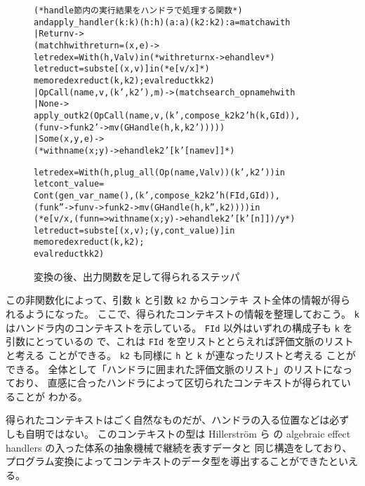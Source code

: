 \begin{figure}
\begin{spacing}{0.9}
\begin{alltt}
(* handle 節内の実行結果をハンドラで処理する関数 *)
and apply_handler (k : k) (h : h) (a : a) (k2 : k2) : a = match a with
  | Return v ->
    (match h with \LBR{}return = (x, e)\RBR ->
      \colorbox{lg}{let redex = With (h, Val v) in  (* with \LBR{}return x -> e\RBR handle v *)}
      let reduct = subst e [(x, v)] in  \colorbox{lg}{(* e[v/x] *)}
      \colorbox{lg}{memo redex reduct (k, k2);} eval reduct k k2)
  | OpCall (name, v, \colorbox{lg}{(k', k2'),} m) -> (match search_op name h with
    | None ->
      apply_out k2 (OpCall (name, v, \colorbox{lg}{(k', compose_k2 k2' h (k, GId)),}
        (fun v -> fun k2' -> m v (GHandle (h, k, k2')))))
    | Some (x, y, e) ->
      \colorbox{lg}{(* with \LBR{}name(x; y) -> e\RBR handle k2'[k'[name v]] *)}
\end{alltt}
\vspace{-26pt}
\begin{alltt}
      \colorbox{lg}{let redex = With (h, plug_all (Op (name, Val v)) (k', k2')) in}
      let cont_value =
        Cont (\colorbox{lg}{gen_var_name (),} (k', compose_k2 k2' h (FId, GId)),
          (fun k'' -> fun v -> fun k2 -> m v (GHandle (h, k'', k2)))) in
      \colorbox{lg}{(* e[v/x, (fun n => with \LBR{}name(x; y) -> e\RBR handle k2'[k'[n]]) /y *)}
      let reduct = subst e [(x, v); (y, cont_value)] in
      \colorbox{lg}{memo redex reduct (k, k2);}
      eval reduct k k2)
\end{alltt}
\caption{変換の後、出力関数を足して得られるステッパ}
\label{figure:5memo}
\end{spacing}
\end{figure}

この非関数化によって、引数 \texttt{k} と引数 \texttt{k2} からコンテキ
スト全体の情報が得られるようになった。
ここで、得られたコンテキストの情報を整理しておこう。
\texttt{k} はハンドラ内のコンテキストを示している。
\texttt{FId} 以外はいずれの構成子も \texttt{k} を引数にとっているの
で、これは \texttt{FId} を空リストととらえれば評価文脈のリストと考える
ことができる。
\texttt{k2} も同様に \texttt{h} と \texttt{k} が連なったリストと考える
ことができる。
全体として「ハンドラに囲まれた評価文脈のリスト」のリストになっており、
直感に合ったハンドラによって区切られたコンテキストが得られていることが
わかる。

得られたコンテキストはごく自然なものだが、ハンドラの入る位置などは必ず
しも自明ではない。
このコンテキストの型は
Hillerstr\"{o}m ら \cite{10.1145/2976022.2976033} の
algebraic effect handlers の入った体系の抽象機械で継続を表すデータと
同じ構造をしており、プログラム変換によってコンテキストのデータ型を導出することができたといえる。

